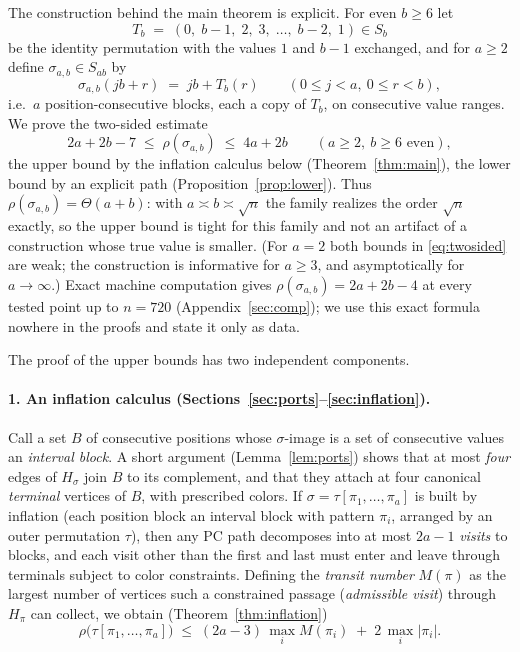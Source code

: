\documentclass[11pt]{article}
\theoremstyle{definition}
\begin{document}
The construction behind the main theorem is explicit. For even $b\ge 6$ let
\[
T_b \;=\; (0,\; b{-}1,\; 2,\; 3,\; \dots,\; b{-}2,\; 1) \in S_b
\]
be the identity permutation with the values $1$ and $b-1$ exchanged, and for $a \ge 2$
define $\sigma_{a,b} \in S_{ab}$ by
\[
\sigma_{a,b}(jb + r) \;=\; jb + T_b(r) \qquad (0 \le j < a,\ 0 \le r < b),
\]
i.e.\ $a$ position-consecutive blocks, each a copy of $T_b$, on consecutive value
ranges. We prove the
two-sided estimate
\begin{equation}\label{eq:twosided}
2a + 2b - 7 \;\le\; \rho(\sigma_{a,b}) \;\le\; 4a + 2b
\qquad (a \ge 2,\ b \ge 6 \text{ even}),
\end{equation}
the upper bound by the inflation calculus below
(Theorem~\ref{thm:main}), the lower bound by an
explicit path (Proposition~\ref{prop:lower}). Thus $\rho(\sigma_{a,b}) = \Theta(a+b)$:
with $a \asymp b \asymp \sqrt n$ the family realizes the order $\sqrt n$ exactly, so
the upper bound is tight for this family and not an artifact of a construction whose
true value is smaller. (For $a = 2$ both bounds in \eqref{eq:twosided} are weak; the
construction is informative for $a \ge 3$, and asymptotically for $a \to \infty$.)
Exact machine computation gives $\rho(\sigma_{a,b}) = 2a + 2b - 4$ at every tested
point up to $n = 720$ (Appendix~\ref{sec:comp}); we use this exact formula nowhere in
the proofs and state it only as data.

The proof of the upper bounds has two independent components.

\paragraph{1. An inflation calculus (Sections~\ref{sec:ports}--\ref{sec:inflation}).}
Call a set $B$ of consecutive positions whose $\sigma$-image is a set of consecutive
values an \emph{interval block}. A short argument (Lemma~\ref{lem:ports}) shows that at
most \emph{four} edges of $H_\sigma$ join $B$ to its complement, and that they attach
at four canonical \emph{terminal} vertices of $B$, with prescribed colors. If
$\sigma = \tau[\pi_1,\dots,\pi_a]$ is built by inflation (each position block an
interval block with pattern $\pi_i$, arranged by an outer permutation $\tau$), then any
PC path decomposes into at most $2a-1$ \emph{visits} to blocks, and each visit other
than the first and last must enter and leave through terminals subject to color
constraints. Defining the \emph{transit number} $M(\pi)$ as the largest number of
vertices such a constrained passage (\emph{admissible visit}) through $H_\pi$ can
collect, we obtain (Theorem~\ref{thm:inflation})
\[
\rho\bigl(\tau[\pi_1,\dots,\pi_a]\bigr) \;\le\; (2a-3)\,\max_i M(\pi_i) \;+\;
2\,\max_i |\pi_i| .
\]
\end{document}
